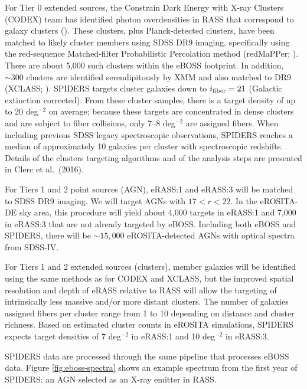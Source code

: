 For Tier 0 extended sources, the Constrain Dark Energy with X-ray
Clusters (CODEX) team has identified photon overdensities in RASS that
correspond to galaxy clusters (\citealt{finoguenov12a}). These
clusters, plus Planck-detected clusters, have been matched to likely
cluster members using SDSS DR9 imaging, specifically using the
red-sequence Matched-filter Probabilistic Percolation method
(redMaPPer; \citealt{rykoff14a}). There are about 5,000 such clusters
within the eBOSS footprint. In addition, $\sim 300$ clusters are
identified serendipitously by XMM and also matched to DR9
(XCLASS; \citealt{clerc12a, sadibekova14a}). SPIDERS targets cluster
galaxies down to $i_{\rm fiber}=21$ (Galactic extinction
corrected). From these cluster samples, there is a target density of
up to 20 deg$^{-2}$ on average; because these targets are concentrated
in dense clusters and are subject to fiber collisions, only 7--8
deg$^{-2}$ are assigned fibers. When including previous SDSS legacy
spectroscopic observations, SPIDERS reaches a median of approximately
10 galaxies per cluster with spectroscopic redshifts. Details of the
clusters targeting algorithms and of the analysis steps are presented
in Clerc et al.~(2016).

For Tiers 1 and 2 point sources (AGN), eRASS:1 and eRASS:3 will be
matched to SDSS DR9 imaging. We will target AGNs with $17<r<22$. In the
eROSITA-DE sky area, this procedure will yield about 4,000 targets in
eRASS:1 and 7,000 in eRASS:3 that are not already targeted by
eBOSS. Including both eBOSS and SPIDERS, there will be $\sim 15,000$
eROSITA-detected AGNs with optical spectra from SDSS-IV.

For Tiers 1 and 2 extended sources (clusters), member galaxies will be
identified using the same methods as for CODEX and XCLASS, but the
improved spatial resolution and depth of eRASS relative to RASS will
allow the targeting of intrinsically less massive and/or more distant
clusters. The number of galaxies assigned fibers per cluster range
from 1 to 10 depending on distance and cluster richness. Based on
estimated cluster counts in eROSITA simulations, SPIDERS expects
target densities of 7 deg$^{-2}$ in eRASS:1 and 10 deg$^{-2}$ in
eRASS:3.

SPIDERS data are processed through the same pipeline that
processes eBOSS data. Figure \ref{fig:eboss-spectra} shows an example
spectrum from the first year of SPIDERS: an AGN selected as an X-ray
emitter in RASS.
